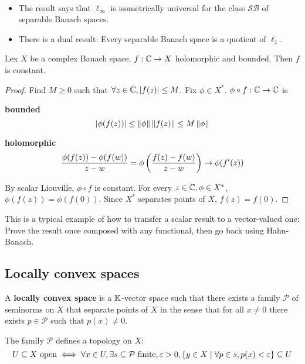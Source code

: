 \documentclass{article}
\begin{document}
\newlec

\begin{rmks}~
  \begin{itemize}
    \item The result says that $\ell_\infty$ is isometrically universal for the class $\mathcal{SB}$ of separable Banach spaces.
    \item There is a dual result: Every separable Banach space is a quotient of $\ell_1$.
  \end{itemize}
\end{rmks}

\begin{nthm}
  Lex $X$ be a complex Banach space, $f : \mathbb C \rightarrow X$ holomorphic and bounded. Then $f$ is constant.
\end{nthm}
\begin{proof}
  Find $M \ge 0$ such that $\forall z \in \mathbb C, \left\lvert f(z)\right\rvert \le M$. Fix $\phi \in X^*$. $\phi \circ f : \mathbb C \rightarrow \mathbb C$ is

  {\bf bounded}
  $$\left\lvert \phi(f(z))\right\rvert \le \left\lVert \phi\right\rVert \left\lVert f(z)\right\rVert \le M\left\lVert \phi\right\rVert$$

  {\bf holomorphic}
  $$\frac{\phi(f(z)) - \phi(f(w))}{z - w} = \phi\left(\frac{f(z) - f(w)}{z - w}\right) \rightarrow \phi(f'(z))$$

  By scalar Liouville, $\phi \circ f$ is constant. For every $z \in \mathbb C, \phi \in X^*$, $\phi(f(z)) = \phi(f(0))$. Since $X^*$ separates points of $X$, $f(z) = f(0)$.
\end{proof}

\begin{rmk}
  This is a typical example of how to transfer a scalar result to a vector-valued one: Prove the result once composed with any functional, then go back using Hahn-Banach.
\end{rmk}

\subsection{Locally convex spaces}

\begin{defi}
  A {\bf locally convex space} is a $\mathbb K$-vector space such that there exists a family $\mathcal P$ of seminorms on $X$ that separate points of $X$ in the sense that for all $x \ne 0$ there exists $p \in \mathcal P$ such that $p(x) \ne 0$.
\end{defi}

The family $\mathcal P$ defines a topology on $X$:
$$U \subseteq X \text{ open} \iff \forall x \in U, \exists s \subseteq \mathcal P \text{ finite}, \varepsilon > 0, \{y \in X \mid \forall p \in s, p(x) < \varepsilon\} \subseteq U$$
\end{document}
